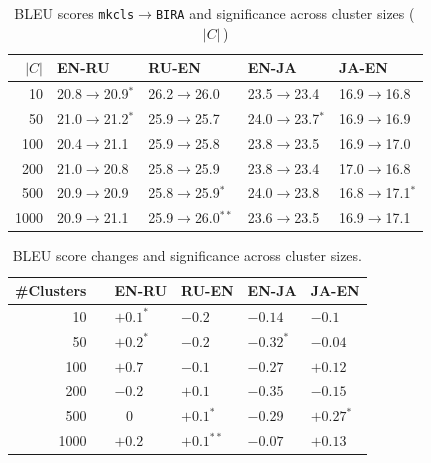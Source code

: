 \begin{table}[H]
\centering
\begin{tabular}{r|ll|ll}
$|C|$ & \bf EN-RU  & \bf RU-EN  & \bf EN-JA  & \bf JA-EN  \\ \hline

10         & 20.8$\rightarrow$20.9$^*$ & 26.2$\rightarrow$26.0         &  23.5$\rightarrow$23.4     &  16.9$\rightarrow$16.8 \\
50         & 21.0$\rightarrow$21.2$^*$ &  25.9$\rightarrow$25.7        &  24.0$\rightarrow$23.7$^*$ &  16.9$\rightarrow$16.9 \\
100        & 20.4$\rightarrow$21.1     &  25.9$\rightarrow$25.8        &  23.8$\rightarrow$23.5     &  16.9$\rightarrow$17.0 \\
200        & 21.0$\rightarrow$20.8     &  25.8$\rightarrow$25.9        &  23.8$\rightarrow$23.4     &  17.0$\rightarrow$16.8 \\
500        & 20.9$\rightarrow$20.9     &  25.8$\rightarrow$25.9$^*$    & 24.0$\rightarrow$23.8      & 16.8$\rightarrow$17.1$^*$ \\
1000       & 20.9$\rightarrow$21.1     &  25.9$\rightarrow$26.0$^{**}$ &  23.6$\rightarrow$23.5     &  16.9$\rightarrow$17.1 \\
\end{tabular}
\caption{BLEU scores \texttt{mkcls}$\rightarrow$\texttt{BIRA} and significance across cluster sizes (\,$|C|$\,)}
\label{table:mkcls2bira}
\end{table}

\begin{table}[H]
\centering
\begin{tabular}{r|lllll} %
	\bf \#Clusters & \hspace{0.3em} & \multicolumn{1}{c}{\bf EN-RU} & \multicolumn{1}{c}{\bf RU-EN} & \multicolumn{1}{c}{\bf EN-JA} & \multicolumn{1}{c}{\bf JA-EN} \\ %
	\hline
	10         & &$ +0.1^*	$&$ -0.2		$&$ -0.14		$&$ -0.1	$\\
    50         & &$ +0.2^*	$&$ -0.2		$&$ -0.32 ^*	$&$ -0.04	$\\
    100        & &$ +0.7		$&$ -0.1		$&$ -0.27		$&$ +0.12	$\\
    200        & &$ -0.2		$&$ +0.1    	$&$ -0.35   	$&$ -0.15	$\\
	500        & &$ \,\,\,\,\,0	$&$ +0.1^*	 	$&$ -0.29   	$&$ +0.27^*	$\\
	1000       & &$ +0.2		$&$ +0.1^{**}	$&$ -0.07    	$&$ +0.13	$\\
\end{tabular}
\caption{BLEU score changes and significance across cluster sizes.}
\label{table:deltabira}
\end{table}

